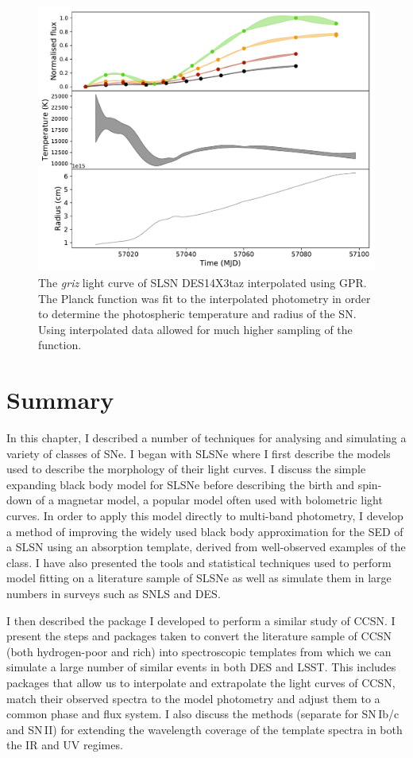 \begin{figure}
  \centering
  \includegraphics[width=\textwidth]{Figures/Chapter3/GP_BB}
  \caption{The \textit{griz} light curve of SLSN DES14X3taz interpolated using GPR. The Planck function was fit to the interpolated photometry in order to determine the photospheric temperature and radius of the SN. Using interpolated data allowed for much higher sampling of the function.}
  \label{fig:GPBB}
\end{figure}

\section{Summary}
In this chapter, I described a number of techniques for analysing and simulating a variety of classes of SNe. I began with SLSNe where I first describe the models used to describe the morphology of their light curves. I discuss the simple expanding black body model for SLSNe before describing the birth and spin-down of a magnetar model, a popular model often used with bolometric light curves. In order to apply this model directly to multi-band photometry, I develop a method of improving the widely used black body approximation for the SED of a SLSN using an absorption template, derived from well-observed examples of the class. I have also presented the tools and statistical techniques used to perform model fitting on a literature sample of SLSNe as well as simulate them in large numbers in surveys such as SNLS and DES.

I then described the package I developed to perform a similar study of CCSN. I present the steps and packages taken to convert the literature sample of CCSN (both hydrogen-poor and rich) into spectroscopic templates from which we can simulate a large number of similar events in both DES and LSST. This includes packages that allow us to interpolate and extrapolate the light curves of CCSN, match their observed spectra to the model photometry and adjust them to a common phase and flux system. I also discuss the methods (separate for SN\,Ib/c and SN\,II) for extending the wavelength coverage of the template spectra in both the IR and UV regimes.

